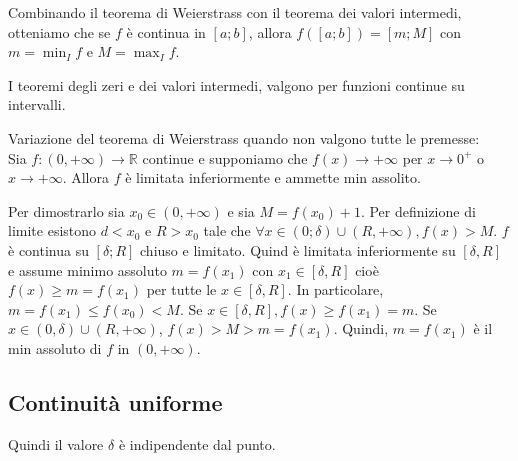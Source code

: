 \documentclass[a4paper]{article}
\begin{document}

Combinando il teorema di Weierstrass con il teorema dei valori intermedi,
otteniamo che se \(f\) è continua in \([a;b]\), allora \(f([a;b]) = [m;M]\)
con \(m = \min_I f\) e \(M = \max_I f\).

I teoremi degli zeri e dei valori intermedi, valgono per funzioni
continue su intervalli.

Variazione del teorema di Weierstrass quando non valgono tutte le premesse: \\
Sia \(f\colon (0, +\infty) \to \mathbb{R}\) continue e supponiamo che \(f(x) \to +\infty\)
per \(x\to 0^+\) o \(x\to +\infty\).
Allora \(f\) è limitata inferiormente e ammette min assolito.

Per dimostrarlo sia \(x_0 \in (0, +\infty)\) e sia \(M = f(x_0) + 1\).
Per definizione di limite esistono \(d < x_0\) e \(R>x_0\)
tale che \(\forall x \in (0; \delta) \cup (R, +\infty), f(x) > M\).
\(f\) è continua su \([\delta; R]\) chiuso e limitato. Quind è limitata inferiormente
su \([\delta, R]\) e assume minimo assoluto \(m=f(x_1)\) con \(x_1 \in [\delta, R]\)
cioè \(f(x) \geq m = f(x_1)\) per tutte le \(x\in [\delta, R]\).
In particolare, \(m=f(x_1) \leq f(x_0) < M\).
Se \(x\in [\delta, R], f(x) \geq f(x_1) = m\).
Se \(x\in (0, \delta) \cup (R, +\infty)\), \(f(x) > M > m = f(x_1)\).
Quindi, \(m = f(x_1)\) è il min assoluto di \(f\) in \((0, +\infty)\).

\subsection{Continuità uniforme}


Quindi il valore \(\delta\) è indipendente dal punto.


\end{document}
